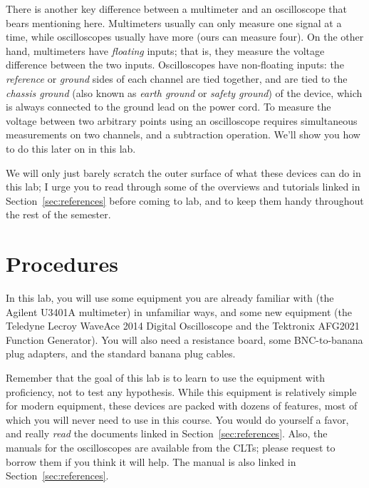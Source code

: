 \documentclass[12pt]{article}
\begin{document}
There is another key difference between a multimeter and an
oscilloscope that bears mentioning here.  Multimeters usually can only
measure one signal at a time, while oscilloscopes usually have more
(ours can measure four).  On the other hand, multimeters have
\textit{floating} inputs; that is, they measure the voltage difference
between the two inputs.  Oscilloscopes have non-floating inputs: the
\textit{reference} or \textit{ground} sides of each channel are tied
together, and are tied to the \textit{chassis ground} (also known as
\textit{earth ground} or \textit{safety ground}) of the device, which
is always connected to the ground lead on the power cord.  To measure
the voltage between two arbitrary points using an oscilloscope
requires simultaneous measurements on two channels, and a subtraction
operation.  We'll show you how to do this later on in this lab.

We will only just barely scratch the outer surface of what these
devices can do in this lab; I urge you to read through some of the
overviews and tutorials linked in Section~\ref{sec:references} before
coming to lab, and to keep them handy throughout the rest of the
semester. 

\section{Procedures}
\label{sec:procedures}

In this lab, you will use some equipment you are already familiar with
(the Agilent U3401A multimeter) in unfamiliar ways, and some new
equipment (the Teledyne Lecroy WaveAce 2014 Digital Oscilloscope and
the Tektronix AFG2021 Function Generator).  You will also need a
resistance board, some BNC-to-banana plug adapters, and the standard
banana plug cables.

Remember that the goal of this lab is to learn to use the equipment
with proficiency, not to test any hypothesis.  While this equipment is
relatively simple for modern equipment, these devices are packed with
dozens of features, most of which you will never need to use in this
course.  You would do yourself a favor, and really \textit{read} the
documents linked in Section~\ref{sec:references}.  Also, the manuals
for the oscilloscopes are available from the CLTs; please request to
borrow them if you think it will help.  The manual is also linked in
Section~\ref{sec:references}.
\end{document}

